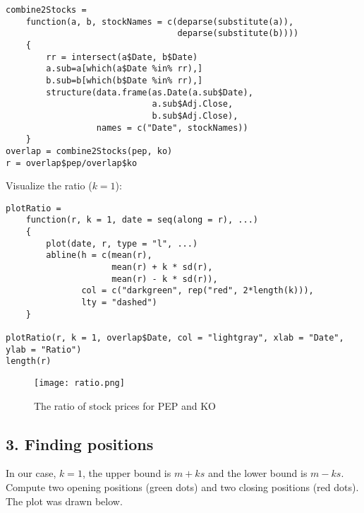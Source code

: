 \documentclass{article}
\begin{document}
\begin{verbatim}
combine2Stocks = 
    function(a, b, stockNames = c(deparse(substitute(a)), 
                                  deparse(substitute(b))))
    {
        rr = intersect(a$Date, b$Date)
        a.sub=a[which(a$Date %in% rr),]
        b.sub=b[which(b$Date %in% rr),]
        structure(data.frame(as.Date(a.sub$Date), 
                             a.sub$Adj.Close, 
                             b.sub$Adj.Close),
                  names = c("Date", stockNames))
    }
overlap = combine2Stocks(pep, ko)
r = overlap$pep/overlap$ko
\end{verbatim}

\noindent Visualize the ratio ($k=1$):

\begin{verbatim}
plotRatio =
    function(r, k = 1, date = seq(along = r), ...)
    {
        plot(date, r, type = "l", ...)
        abline(h = c(mean(r), 
                     mean(r) + k * sd(r), 
                     mean(r) - k * sd(r)), 
               col = c("darkgreen", rep("red", 2*length(k))), 
               lty = "dashed")
    }

plotRatio(r, k = 1, overlap$Date, col = "lightgray", xlab = "Date", ylab = "Ratio")
length(r)
\end{verbatim}

\begin{figure}[H] 
\begin{center} 
\texttt{[image: ratio.png]}  
\caption{The ratio of stock prices for PEP and KO} 
\label{ratio} 
\end{center} 
\end{figure}

\subsection*{3. Finding positions}
In our case, $k=1$, the upper bound is $m+ks$ and the lower bound is $m-ks$. Compute two opening positions (green dots) and two closing positions (red dots). The plot was drawn below.
\end{document}
